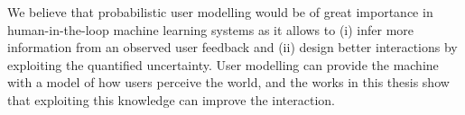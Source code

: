 \documentclass[dissertation,math,vertlayout,pdfa,colorlinks]{aaltoseries}
\begin{document}

We believe that probabilistic user modelling would be of great importance in human-in-the-loop machine learning systems as it allows to (i) infer more information from an observed user feedback and (ii) design better interactions by exploiting the quantified uncertainty. User modelling can provide the machine with a model of how users perceive the world, and the works in this thesis show that exploiting this knowledge can improve the interaction.










\renewcommand{\bibname}{References}
\LARGE  %






\end{document}
